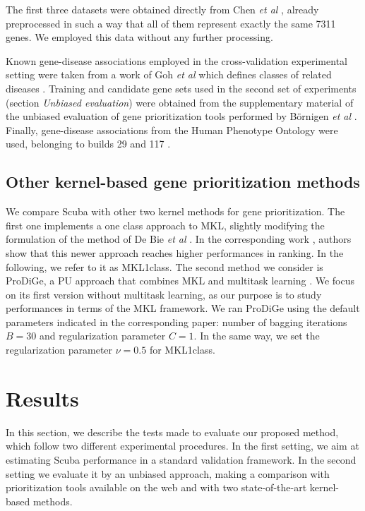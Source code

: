 \documentclass[twocolumn]{bmcart}%
\begin{document}
The first three datasets were obtained directly from Chen \emph{et al} \cite{f3pc}, already preprocessed in such a way that all of them represent exactly the same 7311 genes. We employed this data without any further processing.

Known gene-disease associations employed in the cross-validation experimental setting were taken from a work of Goh \emph{et al} which defines classes of related diseases \cite{goh}. Training and candidate gene sets used in the second set of experiments (section \emph{Unbiased evaluation}) were obtained from the supplementary material of the unbiased evaluation of gene prioritization tools performed by B\"ornigen \emph{et al} \cite{bornigen}. Finally, gene-disease associations from the Human Phenotype Ontology were used, belonging to builds 29 and 117 \cite{hpo}.

\subsection*{Other kernel-based gene prioritization methods}
We compare Scuba with other two kernel methods for gene prioritization. The first one implements a one class approach to MKL, slightly modifying the formulation of the method of De Bie \emph{et al} \cite{debie}. In the corresponding work \cite{mkl1class}, authors show that this newer approach reaches higher performances in ranking. In the following, we refer to it as MKL1class. The second method we consider is ProDiGe, a PU approach that combines MKL and multitask learning \cite{prodige}. We focus on its first version without multitask learning, as our purpose is to study performances in terms of the MKL framework. We ran ProDiGe using the default parameters indicated in the corresponding paper: number of bagging iterations $B=30$ and regularization parameter $C=1$. In the same way, we set the regularization parameter $\nu=0.5$ for MKL1class.



\section*{Results}
In this section, we describe the tests made to evaluate our proposed method, which follow two different experimental procedures. In the first setting, we aim at estimating Scuba performance in a standard validation framework. In the second setting we evaluate it by an unbiased approach, making a comparison with prioritization tools available on the web and with two state-of-the-art kernel-based methods.
\end{document}

